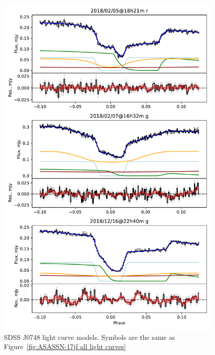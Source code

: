 %     

\begin{figure}
    \centering
    \includegraphics[width=\textwidth]{figures/results/SDSS0748/SDSS0748_1.pdf}
    \caption{SDSS J0748 light curve models. Symbols are the same as Figure~\ref{fig:ASASSN-17jf all light curves}}
    \label{fig:SDSS J0748 all light curves}
\end{figure}
